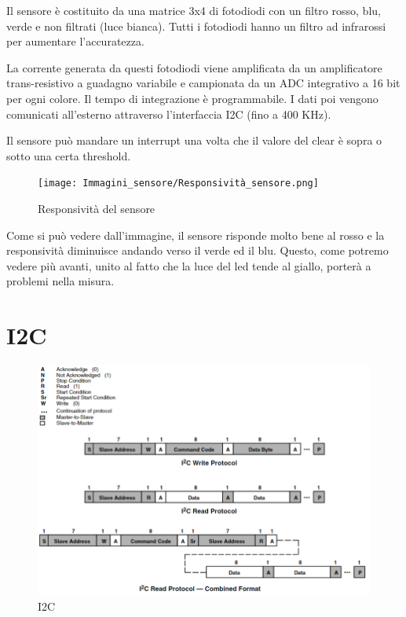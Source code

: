 \documentclass[12pt]{report}
\begin{document}
Il sensore è costituito da una matrice 3x4 di fotodiodi con un filtro rosso, blu, verde e non filtrati (luce bianca). Tutti i fotodiodi hanno un filtro ad infrarossi per aumentare l'accuratezza. 

La corrente generata da questi fotodiodi viene amplificata da un amplificatore trans-resistivo a guadagno variabile e campionata da un ADC integrativo a 16 bit per ogni colore. Il tempo di integrazione è programmabile. I dati poi vengono comunicati all'esterno attraverso l'interfaccia I2C (fino a 400 KHz).

 Il sensore può mandare un interrupt una volta che il valore del clear è sopra o sotto una certa threshold.

\begin{figure}
\centering
    \texttt{[image: Immagini\_sensore/Responsività\_sensore.png]}
    \caption{Responsività del sensore}
\end{figure}

Come si può vedere dall'immagine, il sensore risponde molto bene al rosso e la responsività diminuisce andando verso il verde ed il blu. Questo, come potremo vedere più avanti, unito al fatto che la luce del led tende al giallo, porterà a problemi nella misura.

\section{I2C}

\begin{figure}
    \includegraphics[width=\textwidth]{Immagini_sensore/I2C.png}
    \caption{I2C}
\end{figure}
\end{document}
